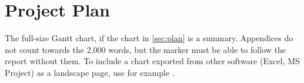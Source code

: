 \section{Project Plan}
\label{app:project-plan}

\begin{guidance}
The full-size Gantt chart, if the chart in \cref{sec:plan} is a summary.
Appendices do not count towards the 2,000 words, but the marker must be
able to follow the report without them. To include a chart exported from
other software (Excel, MS Project) as a landscape page, use for example
\verb||.
\end{guidance}

  {}
  {\iffinalmode\else
     \fi}
